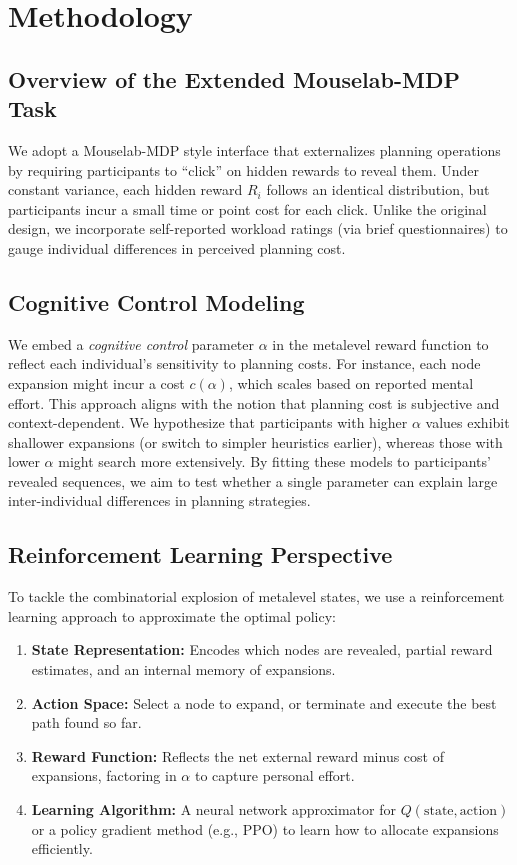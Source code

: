 \documentclass[a4paper,12pt,oneside,article]{memoir}
\begin{document}
\section*{Methodology}
\subsection*{Overview of the Extended Mouselab-MDP Task}
We adopt a Mouselab-MDP style interface that externalizes planning operations by requiring participants to “click” on hidden rewards to reveal them. Under constant variance, each hidden reward $R_i$ follows an identical distribution, but participants incur a small time or point cost for each click. Unlike the original design, we incorporate self-reported workload ratings (via brief questionnaires) to gauge individual differences in perceived planning cost.

\subsection*{Cognitive Control Modeling}
\label{sec:cogcontrol}
We embed a \emph{cognitive control} parameter $\alpha$ in the metalevel reward function to reflect each individual’s sensitivity to planning costs. For instance, each node expansion might incur a cost $c(\alpha)$, which scales based on reported mental effort. This approach aligns with the notion that planning cost is subjective and context-dependent.  
We hypothesize that participants with higher $\alpha$ values exhibit shallower expansions (or switch to simpler heuristics earlier), whereas those with lower $\alpha$ might search more extensively. By fitting these models to participants’ revealed sequences, we aim to test whether a single parameter can explain large inter-individual differences in planning strategies.

\subsection*{Reinforcement Learning Perspective}
To tackle the combinatorial explosion of metalevel states, we use a reinforcement learning approach to approximate the optimal policy:
\begin{enumerate}
    \item \textbf{State Representation:} Encodes which nodes are revealed, partial reward estimates, and an internal memory of expansions.
    \item \textbf{Action Space:} Select a node to expand, or terminate and execute the best path found so far.
    \item \textbf{Reward Function:} Reflects the net external reward minus cost of expansions, factoring in $\alpha$ to capture personal effort.
    \item \textbf{Learning Algorithm:} A neural network approximator for $Q(\text{state}, \text{action})$ or a policy gradient method (e.g., PPO) to learn how to allocate expansions efficiently.
\end{enumerate}
\sloppy
\end{document}
